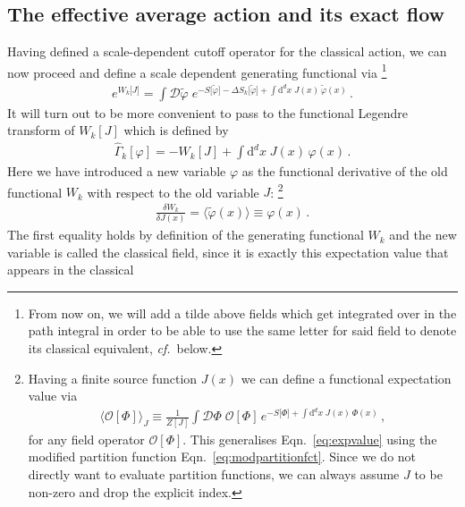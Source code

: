 \documentclass[11pt]{book}
\newcommand\cf{\textit{cf.}\ }
\numberwithin{equation}{chapter}
\begin{document}
\subsection{The effective average action and its exact flow}
\label{sec:floweqn}

Having defined a scale-dependent cutoff operator for the
classical action, we can now proceed and define a scale
dependent generating functional via%
\footnote{%
  From now on,
  we will add a tilde above fields which get integrated over in the
  path integral in order to be able to use the same letter for said
  field to denote its classical equivalent, \cf below.
}
\begin{align}
  e^{ W_k \lbrack J \rbrack }
  = \int \mathcal D \tilde \varphi \;
  e^{
    - S \lbrack \tilde \varphi \rbrack
    - \Delta S_k \lbrack \tilde \varphi \rbrack
    + \int \mathrm d^dx \; J(x) \, \tilde \varphi(x)
  } \,.
\end{align}
It will turn out to be more convenient to pass to the
functional Legendre transform of $W_k[J]$
which is defined by
\begin{align}
  \hat \Gamma_k [\varphi] = - W_k[J] + \int \mathrm d^dx \; J(x) \, \varphi(x) \,.
\end{align}
Here we have introduced a new variable $\varphi$ as
the functional derivative of the old functional $W_k$ with
respect to the old variable $J$:%
\footnote{%
  Having a finite source function $J(x)$ we can define a
  functional expectation value via
  \begin{align*}
    \big\langle  \mathcal O[\Phi] \big\rangle_J
    \equiv \frac{1}{Z[J]} \int \mathcal D \Phi \;
    \mathcal O[\Phi] \,
    e^{
      - S \lbrack \Phi \rbrack
      + \int \mathrm d^dx \; J(x) \, \Phi(x)
    } \,,
    \label{eq:expvalueJ}
  \end{align*}
  for any field operator $\mathcal O[\Phi]$. This generalises
  Eqn.~\eqref{eq:expvalue} using the modified partition
  function Eqn.~\eqref{eq:modpartitionfct}. Since we do not
  directly want to evaluate partition functions,
  we can always assume $J$ to be non-zero and drop the explicit index.
}
\begin{align}
  \frac{ \delta W_k }{ \delta J(x) }
  = \big\langle \tilde \varphi(x) \big\rangle
  \equiv \varphi (x) \,.
\end{align}
The first equality holds by definition of the generating functional
$W_k$ and the new variable is called the classical field, since
it is exactly this expectation value that appears in the classical
\end{document}
